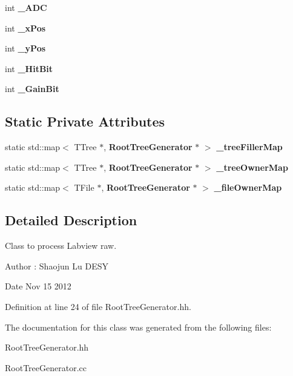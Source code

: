 \begin{DoxyCompactItemize}
\item 
int {\bfseries \_\-ADC}\label{classCALICE_1_1RootTreeGenerator_a17be8de3b6d4141fc160b9786d8a490a}

\item 
int {\bfseries \_\-xPos}\label{classCALICE_1_1RootTreeGenerator_a5cb40db584a71f4fee52632af926d557}

\item 
int {\bfseries \_\-yPos}\label{classCALICE_1_1RootTreeGenerator_a3b7c14462377dbf7f2aa7b567df36f07}

\item 
int {\bfseries \_\-HitBit}\label{classCALICE_1_1RootTreeGenerator_afb3bc01afed020817d8a85d4f44cdb9a}

\item 
int {\bfseries \_\-GainBit}\label{classCALICE_1_1RootTreeGenerator_ae14d571f1c455371bc5bc3ae391b9f22}

\end{DoxyCompactItemize}
\subsection*{Static Private Attributes}
\begin{DoxyCompactItemize}
\item 
static std::map$<$ TTree $\ast$, {\bf RootTreeGenerator} $\ast$ $>$ {\bfseries \_\-treeFillerMap}\label{classCALICE_1_1RootTreeGenerator_a1edff2386c6a6051202d21be447fea69}

\item 
static std::map$<$ TTree $\ast$, {\bf RootTreeGenerator} $\ast$ $>$ {\bfseries \_\-treeOwnerMap}\label{classCALICE_1_1RootTreeGenerator_a331544fd3dfee404ad0d1c5492741ad4}

\item 
static std::map$<$ TFile $\ast$, {\bf RootTreeGenerator} $\ast$ $>$ {\bfseries \_\-fileOwnerMap}\label{classCALICE_1_1RootTreeGenerator_aaabe9bfde58f05c43dfa886545fa68ee}

\end{DoxyCompactItemize}


\subsection{Detailed Description}
Class to process Labview raw. \begin{DoxyAuthor}{Author}
: Shaojun Lu DESY 
\end{DoxyAuthor}
\begin{DoxyDate}{Date}
Nov 15 2012 
\end{DoxyDate}


Definition at line 24 of file RootTreeGenerator.hh.

The documentation for this class was generated from the following files:\begin{DoxyCompactItemize}
\item 
RootTreeGenerator.hh\item 
RootTreeGenerator.cc\end{DoxyCompactItemize}
